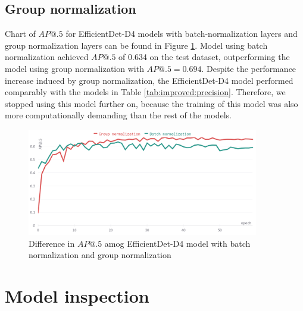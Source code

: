 \subsection{Group normalization}
Chart of $AP@.5$ for EfficientDet-D4 models with batch-normalization layers and group normalization layers can be found in Figure \ref{fig:batch_group_diff}. Model using batch normalization achieved $AP@.5$ of 0.634 on the test dataset, outperforming the model using group normalization with $AP@.5=0.694$. Despite the performance increase induced by group normalization, the EfficientDet-D4 model performed comparably with the models in Table \ref{tab:improved:precision}. Therefore, we stopped using this model further on, because the training of this model was also more computationally demanding than the rest of the models.
\begin{figure}[H]
    \centering
    \includegraphics[width=0.9\textwidth]{images/group_norm_batch_norm.png}
    \caption{Difference in $AP@.5$ amog EfficientDet-D4 model with batch normalization and group normalization}
    \label{fig:batch_group_diff}
\end{figure}

\section{Model inspection}
\label{sec:model_inspection_results}
